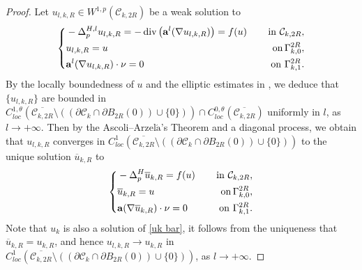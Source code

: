 \documentclass[12pt]{amsart}
\theoremstyle{definition}
\theoremstyle{remark}
\theoremstyle{conclusion}
\theoremstyle{conjecture}
\numberwithin{equation}{section}
\begin{document}
\begin{proof}
Let $u_{l,k,R}\in W^{1,p}(\mathcal{C}_{k,2R})$ be a weak solution to
\begin{equation}\label{ulk}
    \left\{
            \begin{aligned}
            & -\Delta ^{H,l}_{p}u_{l,k,R}=-\operatorname{div}\left({\bf{a}}^l(\nabla u_{l,k,R})\right)=f(u)\quad \, &{\rm{in}}\,\, \mathcal{C}_{k,2R},\\
            &u_{l,k,R}=u \quad \, &{\rm{on}}\, \Gamma_{k,0}^{2R},\\
            &{\bf{a}}^l(\nabla u_{l,k,R})\cdot \nu =0\quad\, &{\rm{on}}\,\, \Gamma_{k,1}^{2R}.
            \end{aligned}
            \right.
\end{equation}
By the locally boundedness of $u$ and the elliptic estimates in \cite{L,S,T}, we deduce that $\{u_{l,k,R}\}$ are bounded in
 $C^{1,\theta}_{loc}(\overline{\mathcal{C}_{k,2R}}\setminus((\partial\mathcal{C}_k\cap\partial B_{2R}(0))\cup\{0\}))\cap C^{0,\theta}_{loc}(\overline{\mathcal{C}_{k,2R}})$ uniformly in $l$, as $l\rightarrow+\infty$. Then by the Ascoli--Arzel$\acute{\text{a}}$'s Theorem and a diagonal process, we obtain that  $u_{l,k,R}$
   converges in $C^{1}_{loc}(\overline{\mathcal{C}_{k,2R}}\setminus((\partial\mathcal{C}_k\cap\partial B_{2R}(0))\cup\{0\}))$ to the unique solution $\overline{u}_{k,R}$ to
 \begin{equation}\label{uk bar}
    \left\{
        \begin{aligned}
        & -\Delta ^{H}_{p}\overline{u}_{k,R}=f(u)\quad \, &{\rm{in}}\,\, \mathcal{C}_{k,2R},\\
        &\overline{u}_{k,R}=u \quad \, &{\rm{on}}\, \Gamma_{k,0}^{2R},\\
        &{\bf{a}}(\nabla \overline{u}_{k,R})\cdot \nu =0\quad\, &{\rm{on}}\,\, \Gamma_{k,1}^{2R}.
        \end{aligned}
        \right.
   \end{equation}
Note that $u_k$ is also a solution of \eqref{uk bar}, it follows from the uniqueness that $\overline{u}_{k,R}=u_{k,R}$, and hence $u_{l,k,R}\rightarrow u_{k,R}$ in $C^{1}_{loc}(\overline{\mathcal{C}_{k,2R}}\setminus((\partial\mathcal{C}_k\cap\partial B_{2R}(0))\cup\{0\}))$, as $l\rightarrow+\infty$.


\end{proof}
\end{document}
